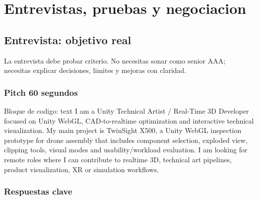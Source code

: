 \chapter{Entrevistas, pruebas y negociacion}

\section{Entrevista: objetivo real}


La entrevista debe probar criterio. No necesitas sonar como senior AAA; necesitas explicar decisiones, limites y mejoras con claridad.


\subsection{Pitch 60 segundos}


\begin{mdcode}
Bloque de codigo: text
I am a Unity Technical Artist / Real-Time 3D Developer focused on Unity WebGL, CAD-to-realtime optimization and interactive technical visualization. My main project is TwinSight X500, a Unity WebGL inspection prototype for drone assembly that includes component selection, exploded view, clipping tools, visual modes and usability/workload evaluation. I am looking for remote roles where I can contribute to realtime 3D, technical art pipelines, product visualization, XR or simulation workflows.
\end{mdcode}


\subsection{Respuestas clave}


